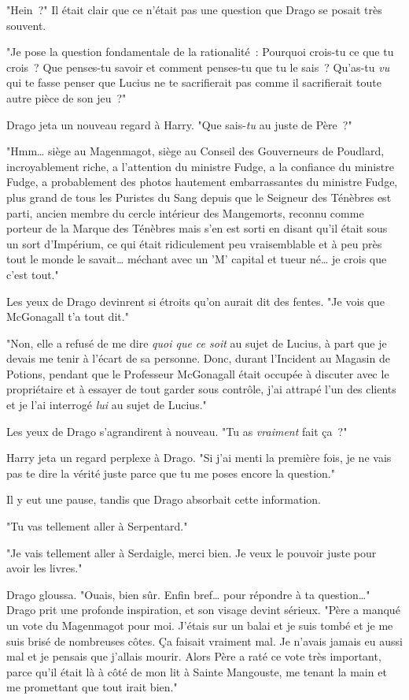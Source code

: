 "Hein~?" Il était clair que ce n'était pas une question que Drago se posait très souvent.

"Je pose la question fondamentale de la rationalité~: Pourquoi crois-tu ce que tu crois~? Que penses-tu savoir et comment penses-tu que tu le sais~? Qu'as-tu \emph{vu} qui te fasse penser que Lucius ne te sacrifierait pas comme il sacrifierait toute autre pièce de son jeu~?"

Drago jeta un nouveau regard à Harry. "Que sais-\emph{tu} au juste de Père~?"

"Hmm… siège au Magenmagot, siège au Conseil des Gouverneurs de Poudlard, incroyablement riche, a l'attention du ministre Fudge, a la confiance du ministre Fudge, a probablement des photos hautement embarrassantes du ministre Fudge, plus grand de tous les Puristes du Sang depuis que le Seigneur des Ténèbres est parti, ancien membre du cercle intérieur des Mangemorts, reconnu comme porteur de la Marque des Ténèbres mais s'en est sorti en disant qu'il était sous un sort d'Impérium, ce qui était ridiculement peu vraisemblable et à peu près tout le monde le savait… méchant avec un 'M' capital et tueur né… je crois que c'est tout."

Les yeux de Drago devinrent si étroits qu'on aurait dit des fentes. "Je vois que McGonagall t'a tout dit."

"Non, elle a refusé de me dire \emph{quoi que ce soit} au sujet de Lucius, à part que je devais me tenir à l'écart de sa personne. Donc, durant l'Incident au Magasin de Potions, pendant que le Professeur McGonagall était occupée à discuter avec le propriétaire et à essayer de tout garder sous contrôle, j'ai attrapé l'un des clients et je l'ai interrogé \emph{lui} au sujet de Lucius."

Les yeux de Drago s'agrandirent à nouveau. "Tu as \emph{vraiment} fait ça~?"

Harry jeta un regard perplexe à Drago. "Si j'ai menti la première fois, je ne vais pas te dire la vérité juste parce que tu me poses encore la question."

Il y eut une pause, tandis que Drago absorbait cette information.

"Tu vas tellement aller à Serpentard."

"Je vais tellement aller à Serdaigle, merci bien. Je veux le pouvoir juste pour avoir les livres."

Drago gloussa. "Ouais, bien sûr. Enfin bref… pour répondre à ta question…" Drago prit une profonde inspiration, et son visage devint sérieux. "Père a manqué un vote du Magenmagot pour moi. J'étais sur un balai et je suis tombé et je me suis brisé de nombreuses côtes. Ça faisait vraiment mal. Je n'avais jamais eu aussi mal et je pensais que j'allais mourir. Alors Père a raté ce vote très important, parce qu'il était là à côté de mon lit à Sainte Mangouste, me tenant la main et me promettant que tout irait bien."

